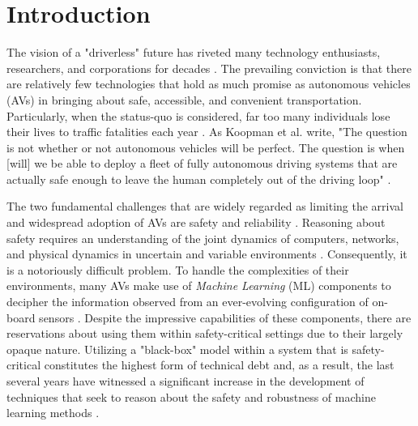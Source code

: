 \documentclass[manuscript,screen,review]{acmart}
\newcommand{\todo}[1]{\textcolor{red}{\textbf{\underline{TODO:}} #1}}
\begin{document}





\maketitle

\section{Introduction}


The vision of a "driverless" future has riveted many technology enthusiasts, researchers, and corporations for decades \cite{Badue2019}. The prevailing conviction is that there are relatively few technologies that hold as much promise as autonomous vehicles (AVs) in bringing about safe, accessible, and convenient transportation. Particularly, when the status-quo is considered, far too many individuals lose their lives to traffic fatalities each year \cite{Rasouli2020}. As Koopman et al. write, "The question is not whether or not autonomous vehicles will be perfect. The question is when [will] we be able to deploy a fleet of fully autonomous driving systems that are actually safe enough to leave the human completely out of the driving loop" \cite{Koopman2017}. 

The two fundamental challenges that are widely regarded as limiting the arrival and widespread adoption of AVs are safety and reliability \cite{Majumdar2017}. Reasoning about safety requires an understanding of the joint dynamics of computers, networks, and physical dynamics in uncertain and variable environments \cite{Yurtsever2019}. Consequently, it is a notoriously difficult problem. To handle the complexities of their environments, many AVs make use of \emph{Machine Learning} (ML) components to decipher the information observed from an ever-evolving configuration of on-board sensors \cite{Yurtsever2019}. Despite the impressive capabilities of these components, there are reservations about using them within safety-critical settings due to their largely opaque nature. Utilizing a "black-box" model within a system that is safety-critical constitutes the highest form of technical debt \cite{Sculley2015} and, as a result, the last several years have witnessed a significant increase in the development of techniques that seek to reason about the safety and robustness of machine learning methods \cite{xiang20118survey}.
\end{document}
